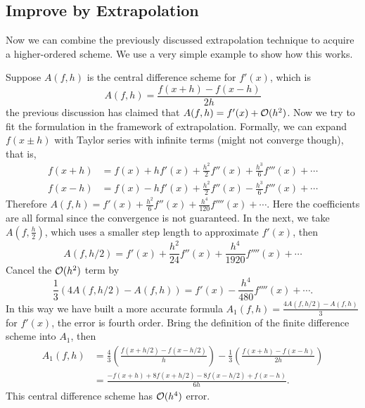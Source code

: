 \subsection{Improve by Extrapolation}
\label{SSec: 3-Imp-by-Ext}
Now we can combine the previously discussed extrapolation technique to acquire a higher-ordered scheme. We use a very simple example to show how this works. 
\begin{example}
    Suppose $A(f, h)$ is the central difference scheme for $f'(x)$, which is 
    \begin{equation}
        A(f, h) = \frac{f(x + h) - f(x- h)}{2h}
    \end{equation}
    the previous discussion has claimed that $A(f, h) = f'(x) + \mathcal O(h^2)$. Now we try to fit the formulation in the framework of extrapolation. Formally, we can expand $f(x\pm h)$ with Taylor series with infinite terms (might not converge though), that is, 
    \begin{equation}
        \begin{aligned}
            f(x + h) &= f(x) + h f'(x) + \frac{h^2}{2} f''(x) + \frac{h^3}{6} f'''(x) + \cdots \\
            f(x - h) &= f(x) - h f'(x) + \frac{h^2}{2} f''(x) - \frac{h^3}{6} f'''(x) + \cdots 
        \end{aligned}
    \end{equation}
    Therefore $A(f, h) = f'(x) + \frac{h^2}{6} f''(x) + \frac{h^4}{120}f''''(x) + \cdots $. Here the coefficients are all formal since the convergence is not guaranteed. In the next, we take $A(f, \frac{h}{2})$, which uses a smaller step length to approximate $f'(x)$, then 
    \begin{equation}
        A(f, h/2) =  f'(x) + \frac{h^2}{24} f''(x) + \frac{h^4}{1920}f''''(x) + \cdots
    \end{equation}
    Cancel the $\mathcal O(h^2)$ term by $$\frac{1}{3}\left( 4 A(f, h/2) - A(f, h) \right) =  f'(x) - \frac{h^4}{480} f''''(x) +\cdots. $$
    In this way we have built a more accurate  formula $A_1(f, h) = \frac{4 A(f, h/2) - A(f, h)}{3}$ for $f'(x)$, the error is fourth order. Bring the definition of the finite difference scheme into $A_1$, then 
    \begin{equation}
        \begin{aligned}
        A_1(f, h) &= \frac{4}{3} \left(\frac{f(x + h/2) - f(x - h/2)}{h}\right) - \frac{1}{3} \left(\frac{f(x + h) - f(x - h)}{2h}\right) \\
        &= \frac{-f(x+ h) + 8 f(x + h/2) - 8 f(x - h/2) + f(x - h)}{6h}.
        \end{aligned}
    \end{equation}
    This central difference scheme has $\mathcal O(h^4)$ error. 
\end{example}
